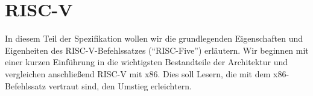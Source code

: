 \chapter{RISC-V}

In diesem Teil der Spezifikation wollen wir die grundlegenden Eigenschaften und
Eigenheiten des RISC-V-Befehlssatzes (``RISC-Five'')
erläutern. Wir beginnen mit einer kurzen Einführung in die wichtigsten
Bestandteile der Architektur und vergleichen anschließend RISC-V mit x86.
Dies soll Lesern, die mit dem x86-Befehlssatz vertraut sind, den Umstieg erleichtern.



